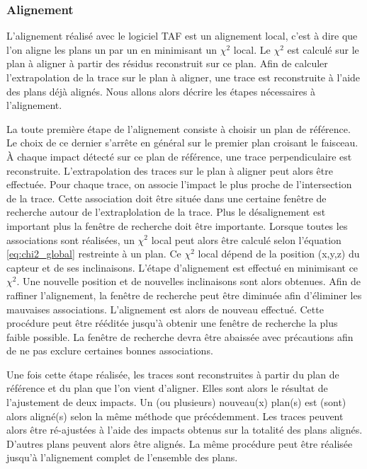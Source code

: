    \subsubsection{Alignement}
   \label{sect:description_alignement}

   L'alignement r\'ealis\'e avec le logiciel TAF est un alignement local, c'est \`a dire que l'on aligne les plans un par un en minimisant un $\chi^2$ local. Le $\chi^2$  est calcul\'e sur le plan \`a aligner \`a partir des r\'esidus reconstruit sur ce plan. Afin de calculer l'extrapolation de la trace sur le plan \`a aligner, une trace est reconstruite \`a l'aide des plans d\'ej\`a align\'es. Nous allons alors d\'ecrire les \'etapes n\'ecessaires \`a l'alignement.

   \medskip
   
   La toute premi\`ere \'etape de l'alignement consiste \`a choisir un plan de r\'ef\'erence. Le choix de ce dernier s'arr\^ete en g\'en\'eral sur le premier plan croisant le faisceau. \`A chaque impact d\'etect\'e sur ce plan de r\'ef\'erence, une trace perpendiculaire est reconstruite. L'extrapolation des traces sur le plan \`a aligner peut alors \^etre effectu\'ee. Pour chaque trace, on associe l'impact le plus proche de l'intersection de la trace. Cette association doit \^etre situ\'ee dans une certaine fenêtre de recherche autour de l'extraplolation de la trace. Plus le d\'esalignement est important plus la fen\^etre de recherche doit \^etre importante. Lorsque toutes les associations sont r\'ealis\'ees, un $\chi^2$ local peut alors \^etre calcul\'e selon l'\'equation \ref{eq:chi2_global} restreinte \`a un plan. Ce $\chi^2$ local d\'epend de la position (x,y,z) du capteur et de ses inclinaisons. L'étape d'alignement est effectu\'e en minimisant ce $\chi^2$. Une nouvelle position et de nouvelles inclinaisons sont alors obtenues. Afin de raffiner l'alignement, la fen\^etre de recherche peut \^etre diminu\'ee afin d'\'eliminer les mauvaises associations. L'alignement est alors de nouveau effectu\'e. Cette proc\'edure peut \^etre r\'e\'edit\'ee jusqu'à obtenir une fen\^etre de recherche la plus faible possible. La fen\^etre de recherche devra \^etre abaiss\'ee avec pr\'ecautions afin de ne pas exclure certaines bonnes associations.
   
   
   \medskip
   
   Une fois cette \'etape r\'ealis\'ee, les traces sont reconstruites \`a partir du plan de r\'ef\'erence et du plan que l'on vient d'aligner. Elles sont alors le r\'esultat de l'ajustement de deux impacts. Un (ou plusieurs) nouveau(x) plan(s) est (sont) alors align\'e(s) selon la m\^eme m\'ethode que pr\'ec\'edemment. Les traces peuvent alors \^etre r\'e-ajust\'ees \`a l'aide des impacts obtenus sur la totalit\'e des plans align\'es. D'autres plans peuvent alors \^etre align\'es. La m\^eme proc\'edure peut \^etre r\'ealis\'ee jusqu'\`a l'alignement complet de l'ensemble des plans.
   
